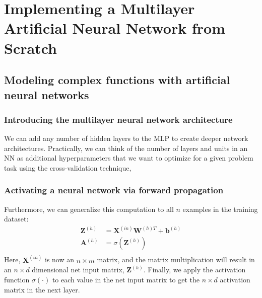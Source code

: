 \chapter{Implementing a Multilayer Artificial Neural Network from Scratch\label{Ch11}}
\section{Modeling complex functions with artificial neural networks}
\subsection{Introducing the multilayer neural network architecture}
\begin{tcolorbox}[title=Adding additional hidden layers]
    We can add any number of hidden layers to the MLP to create deeper network architectures. Practically, we can think of the number of layers and units in an NN as additional hyperparameters that we want to optimize for a given problem task using the cross-validation technique,
\end{tcolorbox}
\subsection{Activating a neural network via forward propagation}
Furthermore, we can generalize this computation to all $n$ examples in the training dataset:
\begin{equation}
    \begin{aligned}
        \bm{Z}^{(h)} & =\bm{X}^{(in)}\bm{W}^{(h)T}+\bm{b}^{(h)} \\
        \bm{A}^{(h)} & =  \sigma(\bm{Z}^{(h)})                  \\
    \end{aligned}
\end{equation}
Here, $\bm{X}^{(in)}$ is now an $n\times m$ matrix, and the matrix multiplication will result in an $n\times d$ dimensional net input matrix, $\bm{Z}^{(h)}$. Finally, we apply the activation function $\sigma(\cdot)$ to each value in the net input matrix to get the $n\times d$ activation matrix in the next layer.
